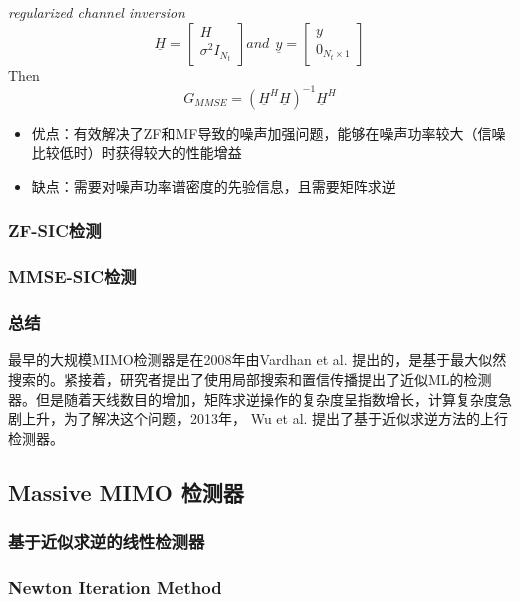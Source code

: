 \emph{regularized channel inversion}
\begin{equation}
    \underline{H}=\begin{bmatrix}
        H \\
        \sigma^2I_{N_t}
        \end{bmatrix} and  \ \ 
        \underline{y}=
        \begin{bmatrix}
        y \\
        0_{N_t\times1}
        \end{bmatrix} 
\end{equation}
Then
\begin{equation}
    G_{MMSE}=(\underline{H}^H\underline{H})^{-1}\underline{H}^H
\end{equation}
\begin{itemize}
    \item 优点：有效解决了ZF和MF导致的噪声加强问题，能够在噪声功率较大（信噪比较低时）时获得较大的性能增益
    \item 缺点：需要对噪声功率谱密度的先验信息，且需要矩阵求逆
\end{itemize}

\subsubsection{ZF-SIC检测}


\subsubsection{MMSE-SIC检测}
\subsubsection{总结}
最早的大规模MIMO检测器是在2008年由Vardhan et al. \cite{Vishnu2008A}提出的，是基于最大似然搜索的。紧接着，研究者提出了使用局部搜索和置信传播提出了近似ML的检测器。但是随着天线数目的增加，矩阵求逆操作的复杂度呈指数增长，计算复杂度急剧上升，为了解决这个问题，2013年，
Wu et al.\cite{2013Approximate} 提出了基于近似求逆方法的上行检测器。

\subsection{Massive MIMO 检测器}
\subsubsection{基于近似求逆的线性检测器}
\subsubsection{Newton Iteration Method}
